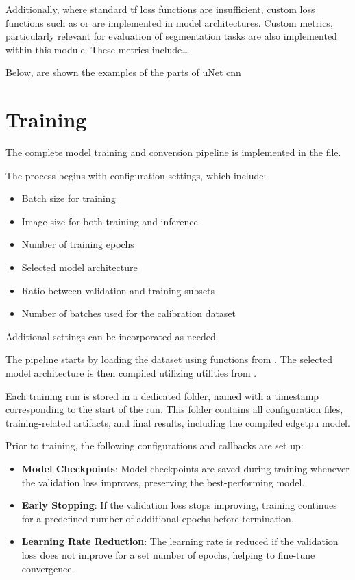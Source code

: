 { 

Additionally, where standard \gls{tf} loss functions are insufficient, custom loss functions such as  or  are implemented in model architectures.
Custom metrics, particularly relevant for evaluation of segmentation tasks are also implemented within this module.
These metrics include\dots
{}


Below, are shown the examples of the parts of uNet \gls{cnn}

\section{Training}
\label{sec:training}

The complete model training and conversion pipeline is implemented in the  file.

The process begins with configuration settings, which include:
\begin{itemize}
\item Batch size for training
\item Image size for both training and inference
\item Number of training epochs
\item Selected model architecture
\item Ratio between validation and training subsets
\item Number of batches used for the calibration dataset
\end{itemize}
Additional settings can be incorporated as needed.

The pipeline starts by loading the dataset using functions from .
The selected model architecture is then compiled utilizing utilities from .

Each training run is stored in a dedicated folder, named with a timestamp corresponding to the start of the run.
This folder contains all configuration files, training-related artifacts, and final results, including the compiled \gls{edgetpu} model.

Prior to training, the following configurations and callbacks are set up:

\begin{itemize}
\item \textbf{Model Checkpoints}: Model checkpoints are saved during training whenever the validation loss improves, preserving the best-performing model.
\item \textbf{Early Stopping}: If the validation loss stops improving, training continues for a predefined number of additional epochs before termination.
\item \textbf{Learning Rate Reduction}: The learning rate is reduced if the validation loss does not improve for a set number of epochs, helping to fine-tune convergence.
\end{itemize}

}
